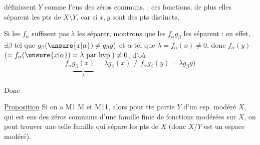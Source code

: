 
définissent $Y$ comme l'ens des zéros communs.  : ces fonctions, de plus elles séparent les pts de $X\setminus Y$, car si $x,y$ sont des pts distincts, 

Si les $f_\alpha$  suffisent pas à les séparer, montrons que les $f_\alpha g_\beta$ les séparent : en effet, $\exists\beta$ tel que $g_\beta(\unsure{x|\alpha})\ne g_\beta y)$  et $\alpha$ tel que $\lambda=f_\alpha(x)\ne0$, donc $f_\alpha(y)$ $(=f_\alpha(\unsure{x|\alpha})=\lambda\text{ par hyp.})\ne0$, d'où
\[
f_\alpha\underbrace{g_\beta(x)}_{\lambda}=\lambda g_\beta(x)\ne f_\alpha g_\beta(y)=\lambda g_\beta y)
\]

Donc \unsure{:|;}

\uline{Proposition} Si on a M1  M et M11, alors pour tte partie   $Y$ d'un esp. modéré $X$, qui est ens des zéros communs d'une famille finie de fonctions modérées sur $X$, on peut trouver une telle famille qui sépare les pts de $X$ (donc $X/Y$ est un espace modéré).

